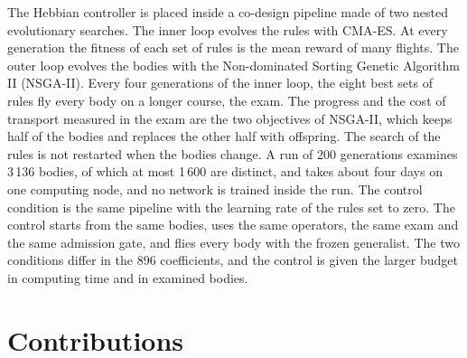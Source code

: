 The Hebbian controller is placed inside a co-design pipeline made of two nested evolutionary searches. The inner loop evolves the rules with CMA-ES. At every generation the fitness of each set of rules is the mean reward of many flights. The outer loop evolves the bodies with the Non-dominated Sorting Genetic Algorithm II (NSGA-II). Every four generations of the inner loop, the eight best sets of rules fly every body on a longer course, the exam. The progress and the cost of transport measured in the exam are the two objectives of NSGA-II, which keeps half of the bodies and replaces the other half with offspring. The search of the rules is not restarted when the bodies change. A run of 200 generations examines 3\,136 bodies, of which at most 1\,600 are distinct, and takes about four days on one computing node, and no network is trained inside the run. The control condition is the same pipeline with the learning rate of the rules set to zero. The control starts from the same bodies, uses the same operators, the same exam and the same admission gate, and flies every body with the frozen generalist. The two conditions differ in the 896 coefficients, and the control is given the larger budget in computing time and in examined bodies.

\section{Contributions}
\label{sec:intro-contributions}


